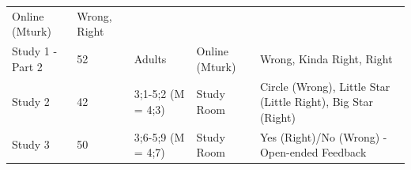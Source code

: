\documentclass[oneside]{report}
\theoremstyle{definition}
\theoremstyle{definition}
\theoremstyle{definition}
\theoremstyle{remark}
\begin{document}
\begin{longtable}[]{@{}lllll@{}}
\begin{minipage}[t]{0.11\columnwidth}
Online (Mturk)\strut
\end{minipage} & \begin{minipage}[t]{0.32\columnwidth}\raggedright\strut
Wrong, Right\strut
\end{minipage}\tabularnewline
\begin{minipage}[t]{0.19\columnwidth}\raggedright\strut
Study 1 - Part 2\strut
\end{minipage} & \begin{minipage}[t]{0.02\columnwidth}\raggedright\strut
52\strut
\end{minipage} & \begin{minipage}[t]{0.20\columnwidth}\raggedright\strut
Adults\strut
\end{minipage} & \begin{minipage}[t]{0.11\columnwidth}\raggedright\strut
Online (Mturk)\strut
\end{minipage} & \begin{minipage}[t]{0.32\columnwidth}\raggedright\strut
Wrong, Kinda Right, Right\strut
\end{minipage}\tabularnewline
\begin{minipage}[t]{0.19\columnwidth}\raggedright\strut
Study 2\strut
\end{minipage} & \begin{minipage}[t]{0.02\columnwidth}\raggedright\strut
42\strut
\end{minipage} & \begin{minipage}[t]{0.20\columnwidth}\raggedright\strut
3;1-5;2 (M = 4;3)\strut
\end{minipage} & \begin{minipage}[t]{0.11\columnwidth}\raggedright\strut
Study Room\strut
\end{minipage} & \begin{minipage}[t]{0.32\columnwidth}\raggedright\strut
Circle (Wrong), Little Star (Little Right), Big Star (Right)\strut
\end{minipage}\tabularnewline
\begin{minipage}[t]{0.19\columnwidth}\raggedright\strut
Study 3\strut
\end{minipage} & \begin{minipage}[t]{0.02\columnwidth}\raggedright\strut
50\strut
\end{minipage} & \begin{minipage}[t]{0.20\columnwidth}\raggedright\strut
3;6-5;9 (M = 4;7)\strut
\end{minipage} & \begin{minipage}[t]{0.11\columnwidth}\raggedright\strut
Study Room\strut
\end{minipage} & \begin{minipage}[t]{0.32\columnwidth}\raggedright\strut
Yes (Right)/No (Wrong) - Open-ended Feedback\strut
\end{minipage}\tabularnewline
\bottomrule
\end{longtable}
\end{document}
